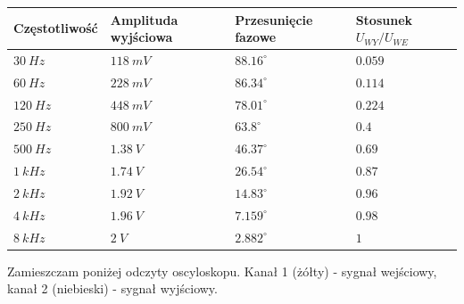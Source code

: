 \documentclass[14pt, table]{extarticle}
\begin{document}
\begin{tabular}{ | m{4cm} | m{4cm}| m{4cm} | m{3.5cm} | } 
  \hline
  \textbf{Częstotliwość} & \textbf{Amplituda wyjściowa} & \textbf{Przesunięcie fazowe} & \textbf{Stosunek } $U_{WY} / U_{WE}$ \\ 
  \hline
  $30 \ Hz$ & $118 \ mV$ & $88.16^{\circ}$ & $0.059$ \\
  \hline
  $60 \ Hz$ & $228 \ mV$ & $86.34^{\circ}$ & $0.114$ \\
  \hline
  $120 \ Hz$ & $448 \ mV$ & $78.01^{\circ}$ & $0.224$ \\
  \hline
  $250 \ Hz$ & $800 \ mV$ & $63.8^{\circ}$ & $0.4$ \\
  \hline
  $500 \ Hz$ & $1.38 \ V$ & $46.37^{\circ}$ & $0.69$ \\
  \hline
  $1 \ kHz$ & $1.74 \ V$ & $26.54^{\circ}$ & $0.87$ \\
  \hline
  $2 \ kHz$ & $1.92 \ V$ & $14.83^{\circ}$ & $0.96$ \\
  \hline
  $4 \ kHz$ & $1.96 \ V$ & $7.159^{\circ}$ & $0.98$ \\
  \hline
  $8 \ kHz$ & $2 \ V$ & $2.882^{\circ}$ &  $1$\\
  \hline
\end{tabular}

\newpage
Zamieszczam poniżej odczyty oscyloskopu. Kanał 1 (żółty) - sygnał wejściowy, kanał 2 (niebieski) - sygnał wyjściowy.

\begin{figure}[H]
    \centering
    \qquad
\end{figure}
\end{document}
